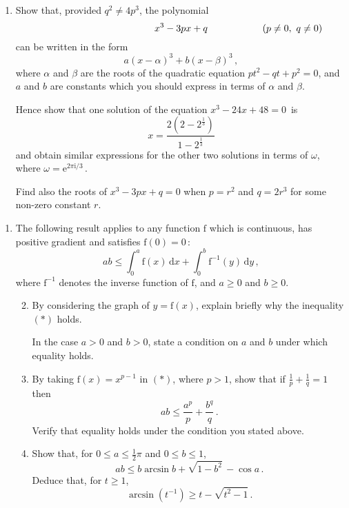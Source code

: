\documentclass[a4, 11pt]{report}
\newlength{\qspace}
\newcounter{qnumber}
\newenvironment{question}%
 {\vspace{\qspace}
  \begin{enumerate}[\bfseries 1\quad][10]%
    \setcounter{enumi}{\value{qnumber}}%
    \item%
 }
{
  \end{enumerate}
  \filbreak
  \stepcounter{qnumber}
 }
\newenvironment{questionparts}[1][1]%
 {
  \begin{enumerate}[\bfseries (i)]%
    \setcounter{enumii}{#1}
    \addtocounter{enumii}{-1}
    \setlength{\itemsep}{5mm}
    \setlength{\parskip}{8pt}
 }
 {
  \end{enumerate}
 }
\def\d{{\mathrm d}}
\def\f{{\mathrm f}}
\def\le{\leqslant}
\def\ge{\geqslant}
\begin{document}
\begin{question}
Show that, provided $q^2\ne 4p^3$,
 the polynomial 
\[
\hphantom{(p\ne0, \ q\ne0)\hspace{2cm}}
x^3-3px +q
\hspace {2cm} (p\ne0, \ q\ne0)
\]
 can be written in the 
form 
\[ a(x-\alpha)^3 + b(x-\beta)^3\,,
\]
where $\alpha$ and $\beta$ are the roots of the quadratic equation
$pt^2 -qt +p^2=0$, and $a$ and $b$ are constants which you should
express in terms of $\alpha$ and $\beta$.

Hence show that one solution of 
 the equation $x^3-24x+48=0\,$ is
\[
x= \frac{2 (2-2^{\frac13})}{1-2^{\frac13}}
\]
and obtain similar expressions for the other two solutions
in
terms of $\omega$,  where $\omega = \mathrm{e}^{2\pi\mathrm{i}/3}\,$.
 

Find also the roots of
$x^3-3px +q=0$
when 
$p=r^2$ and $q= 2r^3$ for some non-zero constant $r$.
\end{question}

\begin{question}
The following result applies to any
 function $\f$ 
which is continuous, has positive  gradient  and satisfies
$\f(0)=0\,$:
\[
ab\le \int_0^a\f(x)\, \d x + \int_0^b \f^{-1}(y)\, \d y\,,
\tag{$*$}\]
where  $\f^{-1}$ denotes the inverse function of $\f$, and  
$a\ge  0$ and $b\ge  0$.



\begin{questionparts}
\item
By considering the graph of $y=\f(x)$, explain briefly why
the inequality $(*)$ holds.

In the case $a>0$ and $b>0$,
state a condition on $a$ and $b$ under which  equality  holds.
\item
By taking $\f(x) = x^{p-1}$ in $(*)$, where $p>1$, show that if
$\displaystyle \frac 1p + \frac 1q =1$ then 
\[
ab \le \frac{a^p}p + \frac{b^q}q\,.
\]
Verify that equality holds under the condition you stated above.

\item
Show that, for $0\le a \le  \frac12 \pi$ and $0\le b \le 1$,  
\[
ab \le  b\arcsin b + \sqrt{1-b^2} \, - \cos a\,.
\]
Deduce that,  
for $t\ge1$, 
\[
\arcsin (t^{-1})  \ge t - \sqrt{t^2-1}\,.
\]

\end{questionparts}
	\end{question}
	
\end{document}
